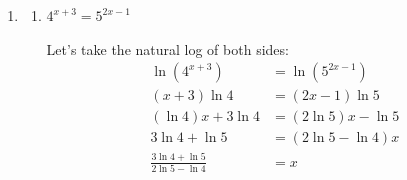 \documentclass{article}
\begin{document}
\begin{enumerate}[resume]
{\begin{multicols}{2}
      \pspacestar{2.5in}

      \begin{solution}
        \begin{align*}
          7^{3x + 1} &= 5 \cdot 7^{x + 3} \\
          \log_7(7^{3x + 1}) &= \log_7(5 \cdot 7^{x + 3}) \\
          \log_7(7^{3x + 1}) &= \log_7(5) + \log_7(7^{x+3})\\
          3x+1 &= \log_7(5) + x+3\\
          2x &= \log_7(5)+2 \\
          x &= \boxed{\tfrac{1}{2}\log_7(5) + 1}
        \end{align*}
      \end{solution}
    \end{multicols}
  }

\item 


  \begin{enumerate}
  \item \label{exponential-equation-two-bases-1}


    \begin{problem}[\vfill]
      $4^{x + 3} = 5^{2x - 1}$
    \end{problem}

    \begin{solution}
      Let's take the natural log of both sides:
      \begin{align*}
        \ln \left( 4^{x + 3} \right) &= \ln \left( 5^{2x - 1} \right) \\
        (x + 3) \ln 4 &= (2x - 1) \ln 5 \\
        (\ln 4) x + 3 \ln 4 &= (2 \ln 5) x - \ln 5 \\
        3 \ln 4 + \ln 5 &= (2 \ln 5 - \ln 4) x \\
        \boxed{\frac{3 \ln 4 + \ln 5}{2 \ln 5 - \ln 4}} &= x
      \end{align*}
    \end{solution}


\end{enumerate}
\end{enumerate}
\end{document}
